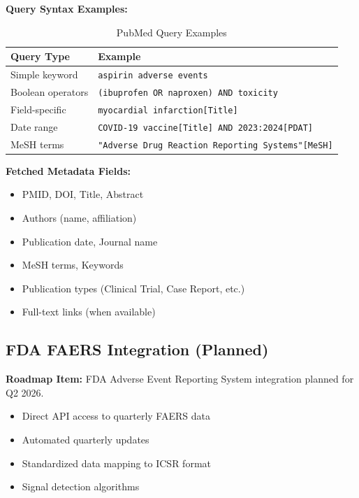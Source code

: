 \textbf{Query Syntax Examples:}
\begin{table}[h]
\centering
\caption{PubMed Query Examples}
\begin{tabularx}{\textwidth}{lX}
\toprule
\textbf{Query Type} & \textbf{Example} \\
\midrule
Simple keyword & \texttt{aspirin adverse events} \\
Boolean operators & \texttt{(ibuprofen OR naproxen) AND toxicity} \\
Field-specific & \texttt{myocardial infarction[Title]} \\
Date range & \texttt{COVID-19 vaccine[Title] AND 2023:2024[PDAT]} \\
MeSH terms & \texttt{"Adverse Drug Reaction Reporting Systems"[MeSH]} \\
\bottomrule
\end{tabularx}
\end{table}

\textbf{Fetched Metadata Fields:}
\begin{itemize}
    \item PMID, DOI, Title, Abstract
    \item Authors (name, affiliation)
    \item Publication date, Journal name
    \item MeSH terms, Keywords
    \item Publication types (Clinical Trial, Case Report, etc.)
    \item Full-text links (when available)
\end{itemize}

\subsection{FDA FAERS Integration (Planned)}

\begin{infobox}
\textbf{Roadmap Item:} FDA Adverse Event Reporting System integration planned for Q2 2026.
\begin{itemize}[noitemsep]
    \item Direct API access to quarterly FAERS data
    \item Automated quarterly updates
    \item Standardized data mapping to ICSR format
    \item Signal detection algorithms
\end{itemize}
\end{infobox}

